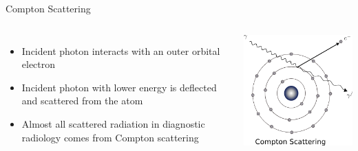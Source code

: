 \begin{frame}[c]{Compton Scattering}
    \begin{columns}[c]
        \begin{itemize}
            \setlength\itemsep{0.2cm}
            \item Incident photon interacts with an outer orbital electron
            \item Incident photon with lower energy is deflected and scattered from the atom
            \item Almost all scattered radiation in diagnostic radiology comes from Compton scattering
        \end{itemize}
        \includegraphics[height=0.6\textheight]{images/compton}\\[-0.5\baselineskip]
    \end{columns}
\end{frame}

